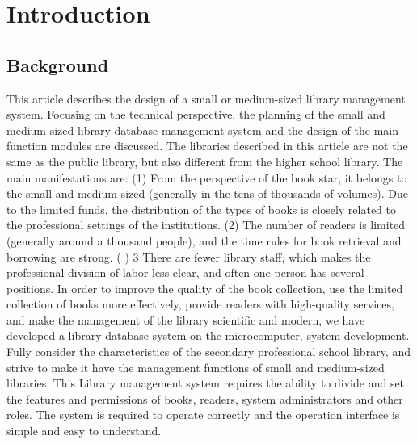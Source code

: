 
\chapter{Introduction} %

\label{Chapter1} %


\newcommand{\keyword}[1]{\textbf{#1}}
\newcommand{\tabhead}[1]{\textbf{#1}}
\newcommand{\code}[1]{\texttt{#1}}
\newcommand{\file}[1]{\texttt{\bfseries#1}}
\newcommand{\option}[1]{\texttt{\itshape#1}}

\section{Background} %

This article describes the design of a small or medium-sized library management system. Focusing on the technical perspective, the planning of the small and medium-sized library database management system and the design of the main function modules are discussed.
The libraries described in this article are not the same as the public library, but also different from the higher school library. The main manifestations are:
(1) From the perspective of the book star, it belongs to the small and medium-sized (generally in the tens of thousands of volumes). Due to the limited funds, the distribution of the types of books is closely related to the professional settings of the institutions.
(2) The number of readers is limited (generally around a thousand people), and the time rules for book retrieval and borrowing are strong. ( ) 3 There are fewer library staff, which makes the professional division of labor less clear, and often one person has several positions.
In order to improve the quality of the book collection, use the limited collection of books more effectively, provide readers with high-quality services, and make the management of the library scientific and modern, we have developed a library database system on the microcomputer, system development. Fully consider the characteristics of the secondary professional school library, and strive to make it have the management functions of small and medium-sized libraries.
This Library management system requires the ability to divide and set the features and permissions of books, readers, system administrators and other roles. The system is required to operate correctly and the operation interface is simple and easy to understand.


